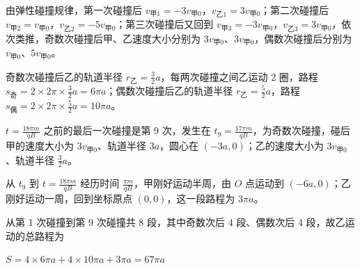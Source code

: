 \documentclass[\gkver]{gaokaozhenti}
\begin{document}
\begin{enumerate}
{由弹性碰撞规律，第一次碰撞后 $v_{\text{甲}1}=-3v_{\text{甲}0}$，$v_{\text{乙}1}=3v_{\text{甲}0}$；第二次碰撞后 $v_{\text{甲}2}=v_{\text{甲}0}$，$v_{\text{乙}2}=-5v_{\text{甲}0}$；第三次碰撞后又回到 $v_{\text{甲}3}=-3v_{\text{甲}0}$，$v_{\text{乙}3}=3v_{\text{甲}0}$，依次类推，奇数次碰撞后甲、乙速度大小分别为 $3v_{\text{甲}0}$、$3v_{\text{甲}0}$，偶数次碰撞后分别为 $v_{\text{甲}0}$、$5v_{\text{甲}0}$。

奇数次碰撞后乙的轨道半径 $r_{\text{乙}}=\frac{3}{2}a$，每两次碰撞之间乙运动 2 圈，路程 $s_{\text{奇}}=2\times2\pi\times\frac{3}{2}a=6\pi a$；偶数次碰撞后乙的轨道半径 $r_{\text{乙}}=\frac{5}{2}a$，路程 $s_{\text{偶}}=2\times2\pi\times\frac{5}{2}a=10\pi a$。

$t=\frac{18\pi m}{qB}$ 之前的最后一次碰撞是第 9 次，发生在 $t_{9}=\frac{17\pi m}{qB}$，为奇数次碰撞，碰后甲的速度大小为 $3v_{\text{甲}0}$、轨道半径 $3a$，圆心在 $(-3a,0)$；乙的速度大小为 $3v_{\text{甲}0}$、轨道半径 $\frac{3}{2}a$。

从 $t_{9}$ 到 $t=\frac{18\pi m}{qB}$ 经历时间 $\frac{\pi m}{qB}$，甲刚好运动半周，由 $O$ 点运动到 $(-6a,0)$；乙刚好运动一周，回到坐标原点 $(0,0)$，这一段路程为 $3\pi a$。

从第 1 次碰撞到第 9 次碰撞共 8 段，其中奇数次后 4 段、偶数次后 4 段，故乙运动的总路程为

$S = 4\times6\pi a + 4\times10\pi a + 3\pi a = 67\pi a$
}

\end{enumerate}
\end{document}

